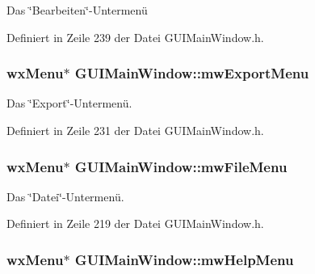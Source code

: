 Das \char`\"{}\-Bearbeiten\char`\"{}-\/\-Untermenü 



Definiert in Zeile 239 der Datei G\-U\-I\-Main\-Window.\-h.

\hypertarget{classGUIMainWindow_a9f6af05ef18bf81ff9955670001941ea}{
\subsubsection[{mw\-Export\-Menu}]{\setlength{\rightskip}{0pt plus 5cm}wx\-Menu$\ast$ G\-U\-I\-Main\-Window\-::mw\-Export\-Menu\hspace{0.3cm}{\ttfamily [private]}}}\label{classGUIMainWindow_a9f6af05ef18bf81ff9955670001941ea}


Das \char`\"{}\-Export\char`\"{}-\/\-Untermenü. 



Definiert in Zeile 231 der Datei G\-U\-I\-Main\-Window.\-h.

\hypertarget{classGUIMainWindow_a3b23fa0fb1d779bd5b8384507d8b90e8}{
\subsubsection[{mw\-File\-Menu}]{\setlength{\rightskip}{0pt plus 5cm}wx\-Menu$\ast$ G\-U\-I\-Main\-Window\-::mw\-File\-Menu\hspace{0.3cm}{\ttfamily [private]}}}\label{classGUIMainWindow_a3b23fa0fb1d779bd5b8384507d8b90e8}


Das \char`\"{}\-Datei\char`\"{}-\/\-Untermenü. 



Definiert in Zeile 219 der Datei G\-U\-I\-Main\-Window.\-h.

\hypertarget{classGUIMainWindow_ae8fc1a9ba3768aa042a77b5bea117f6c}{
\subsubsection[{mw\-Help\-Menu}]{\setlength{\rightskip}{0pt plus 5cm}wx\-Menu$\ast$ G\-U\-I\-Main\-Window\-::mw\-Help\-Menu\hspace{0.3cm}{\ttfamily [private]}}}\label{classGUIMainWindow_ae8fc1a9ba3768aa042a77b5bea117f6c}


